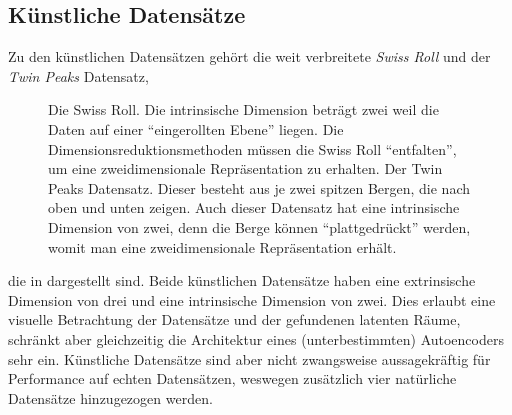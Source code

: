 \subsection{Künstliche Datensätze}
\label{ch:Vergleich:sec:VerwendeteDatensaetze:kuenstlich}
Zu den künstlichen Datensätzen gehört die weit
verbreitete \textit{Swiss Roll} und der \textit{Twin Peaks} Datensatz,
\begin{figure}[ht]
	\label{fig:ArtificialDatasets}
	\begin{center}
		
	\end{center}
	\caption[Künstliche Datensätze]{\figleft Die Swiss Roll. Die intrinsische Dimension beträgt zwei weil die Daten auf einer \enquote{eingerollten Ebene} liegen. Die Dimensionsreduktionsmethoden müssen die Swiss Roll \enquote{entfalten}, um eine zweidimensionale Repräsentation zu erhalten. \figright Der Twin Peaks Datensatz. Dieser besteht aus je zwei spitzen Bergen, die nach oben und unten zeigen. Auch dieser Datensatz hat eine intrinsische Dimension von zwei, denn die Berge können \enquote{plattgedrückt} werden, womit man eine zweidimensionale Repräsentation erhält.}
\end{figure}
die in  dargestellt sind.
Beide künstlichen Datensätze haben eine extrinsische Dimension von drei und eine intrinsische
Dimension von zwei. Dies erlaubt eine visuelle Betrachtung der Datensätze und der gefundenen
latenten Räume, schränkt aber gleichzeitig die Architektur eines (unterbestimmten) Autoencoders
sehr ein. Künstliche Datensätze sind aber nicht zwangsweise aussagekräftig für Performance auf echten Datensätzen, weswegen zusätzlich vier natürliche Datensätze hinzugezogen werden.

